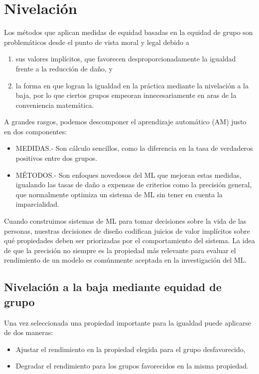 \section{Nivelación}
Los métodos que aplican medidas de equidad basadas en la equidad de grupo son problemáticos desde el punto de vista moral y legal debido a

\begin{enumerate}[(1)]
    \item sus valores implícitos, que favorecen desproporcionadamente la igualdad frente a la reducción de daño, y
    \item la forma en que logran la igualdad en la práctica mediante la nivelación a la baja, por  lo que ciertos grupos empeoran innecesariamente en aras de la conveniencia matemática.
\end{enumerate}
A grandes rasgos, podemos descomponer el aprendizaje automático (AM) justo en dos componentes: 
\begin{itemize}
    \item MEDIDAS.- Son cálculo sencillos, como la diferencia en la tasa de verdaderos positivos entre dos grupos.
    \item MÉTODOS.- Son enfoques novedosos del ML que mejoran estas medidas, igualando las tasas de daño a expensas de criterios como la precisión general, que normalmente optimiza un sistema de ML sin tener en cuenta la imparcialidad.
\end{itemize}

Cuando construimos sistemas de ML para tomar decisiones sobre la vida de las personas, nuestras decisiones de diseño codifican juicios de valor implícitos sobre qué propiedades deben ser priorizadas por el comportamiento del sistema. La idea de que la precisión no siempre es la propiedad más relevante para evaluar el rendimiento de un modelo es comúnmente aceptada en la investigación del ML.\\


\subsection{Nivelación a la baja mediante equidad de grupo}
Una vez seleccionada una propiedad importante para la igualdad puede aplicarse de dos maneras:
\begin{itemize}
    \item Ajustar el rendimiento en la propiedad elegida para el grupo desfavorecido,
    \item Degradar el rendimiento para los grupos favorecidos en la misma propiedad.
\end{itemize}

